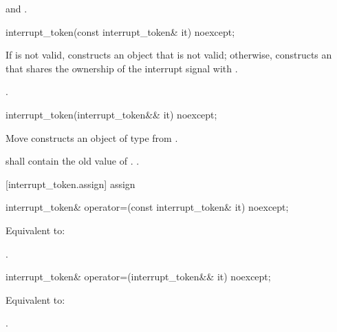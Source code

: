 {\begin{itemdescr}
  \pnum\postconditions {} and .
\end{itemdescr}

%
\begin{itemdecl}
interrupt_token(const interrupt_token& it) noexcept;
\end{itemdecl}
\begin{itemdescr}
  \pnum\effects If  is not valid, constructs an  object
                that is not valid;
                otherwise, constructs an 
                that shares the ownership of the interrupt signal with .

  \pnum\postconditions {}.
\end{itemdescr}

%
\begin{itemdecl}
interrupt_token(interrupt_token&& it) noexcept;
\end{itemdecl}
\begin{itemdescr}
  \pnum\effects Move constructs an object of type  from .

  \pnum\postconditions {} shall contain the old value of .
                        .
\end{itemdescr}

[interrupt_token.assign]{ assign}

%
\begin{itemdecl}
interrupt_token& operator=(const interrupt_token& it) noexcept;
\end{itemdecl}
\begin{itemdescr}
  \pnum\effects Equivalent to: 

  \pnum\returns {}.
\end{itemdescr}

%
\begin{itemdecl}
interrupt_token& operator=(interrupt_token&& it) noexcept;
\end{itemdecl}
\begin{itemdescr}
  \pnum\effects Equivalent to: 

  \pnum\returns {}.
\end{itemdescr}

}
